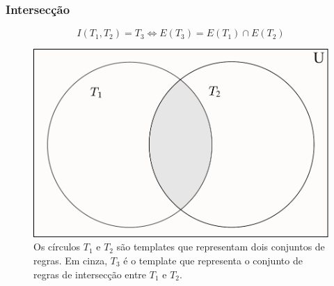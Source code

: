 \documentclass[aspectratio=43,hyperref={pdfpagelabels=false}]{beamer}
\begin{document}
\begin{frame}
	\frametitle{Intersecção}
	\begin{equation}
	I(T_1,T_2)=T_3 \Leftrightarrow E(T_3) = E(T_1) \cap E(T_2)
	\end{equation}

    \begin{figure}[h!]
      \centering
      \includegraphics[width=.4\textwidth]{fig_intersection.pdf}
      \caption{Os círculos $T_1$ e $T_2$ são templates que representam dois conjuntos de regras. Em cinza, $T_3$ é o template que representa o conjunto de regras de intersecção entre $T_1$ e $T_2$.}
      \label{fig:intersection}
    \end{figure}        

 \end{frame}
\end{document}
